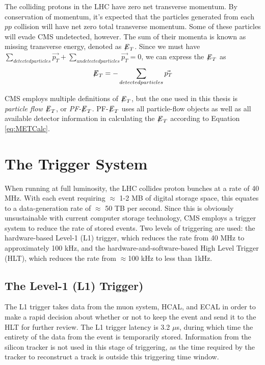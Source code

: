 The colliding protons in the LHC have zero net transverse momentum. By conservation of momentum, it's expected that the particles generated from each $pp$ collision will have net zero total transverse momentum. Some of these particles will evade CMS undetected, however. The sum of their momenta is known as missing transverse energy, denoted as ${\not\mathrel{E}}_T$. Since we must have $\sum_{detected particles} \vec{p_T} + \sum_{undetected particles} \vec{p_T} = 0$, we can express the ${\not\mathrel{E}}_T$ as
\begin{equation} \label{eq:METCalc}
{\not\mathrel{E}}_T = - \sum_{detected particles} \vec{p_T}
\end{equation}

CMS employs multiple definitions of ${\not\mathrel{E}}_T$, but the one used in this thesis is \textit{particle flow ${\not\mathrel{E}}_T$}, or \textit{PF-${\not\mathrel{E}}_T$}. PF-${\not\mathrel{E}}_T$ uses all particle-flow objects as well as all available detector information in calculating the ${\not\mathrel{E}}_T$ according to Equation \ref{eq:METCalc}.


\section{The Trigger System}

When running at full luminosity, the LHC collides proton bunches at a rate of 40 MHz. With each event requiring $\approx$ 1-2 MB of digital storage space, this equates to a data-generation rate of $\approx$ 50 TB per second. Since this is obviously unsustainable with current computer storage technology, CMS employs a trigger system to reduce the rate of stored events. Two levels of triggering are used: the hardware-based Level-1 (L1) trigger, which reduces the rate from 40 MHz to approximately 100 kHz, and the hardware-and-software-based High Level Trigger (HLT), which reduces the rate from $\approx$100 kHz to less than 1kHz.\cite{TDR}

\subsection{The Level-1 (L1) Trigger)}

The L1 trigger takes data from the muon system, HCAL, and ECAL in order to make a rapid decision about whether or not to keep the event and send it to the HLT for further review. The L1 trigger latency is 3.2 $\mu$s, during which time the entirety of the data from the event is temporarily stored. Information from the silicon tracker is not used in this stage of triggering, as the time required by the tracker to reconstruct a track is outside this triggering time window. 

